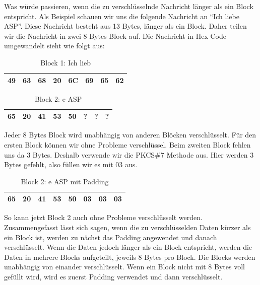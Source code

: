\documentclass[course=asp]{aspdoc}
\begin{document}
Was würde passieren, wenn die zu verschlüsselnde Nachricht länger als ein Block entspricht. Als Beispiel schauen wir uns die folgende Nachricht an “Ich liebe ASP”. Diese Nachricht besteht aus 13 Bytes, länger als ein Block. Daher teilen wir die Nachricht in zwei 8 Bytes Block auf. Die Nachricht in Hex Code umgewandelt sieht wie folgt aus: 
\begin{table}[H]
\centering 
    \begin{tabular}{|l|l|l|l|l|l|l|l|}
        \hline
        49 & 63 & 68 & 20 & 6C & 69 & 65 & 62    \\
        \hline
    \end{tabular}
    \caption{Block 1: Ich lieb}
\end{table}

\begin{table}[H]
\centering 
    \begin{tabular}{|l|l|l|l|l|l|l|l|}
        \hline
         65 & 20 & 41 & 53 & 50 & ?  & ? & ? \\
        \hline
    \end{tabular}
    \caption{Block 2: e ASP}
\end{table}

Jeder 8 Bytes Block wird unabhängig von anderen Blöcken verschlüsselt. Für den ersten Block können wir ohne Probleme verschlüssel. Beim zweiten Block fehlen uns da 3 Bytes. Deshalb verwende wir die PKCS\#7 Methode aus. Hier werden 3 Bytes gefehlt, also füllen wir es mit 03 aus.

\begin{table}[H]
\centering 
    \begin{tabular}{|l|l|l|l|l|l|l|l|}
        \hline
         65 & 20 & 41 & 53 & 50 & 03  & 03 & 03 \\
        \hline
    \end{tabular}
    \caption{Block 2: e ASP mit Padding}
\end{table}
So kann jetzt Block 2 auch ohne Probleme verschlüsselt werden.\\
Zusammengefasst lässt sich sagen, wenn die zu verschlüsselden Daten kürzer als ein Block ist, werden zu nächst das Padding angewendet und danach verschlüsselt. Wenn die Daten jedoch länger als ein Block entspricht, werden die Daten in mehrere Blocks aufgeteilt, jeweils 8 Bytes pro Block. Die Blocks werden unabhängig von einander verschlüsselt. Wenn ein Block nicht mit 8 Bytes voll gefüllt wird, wird es zuerst Padding verwendet und dann verschlüsselt.


\newpage
\end{document}
